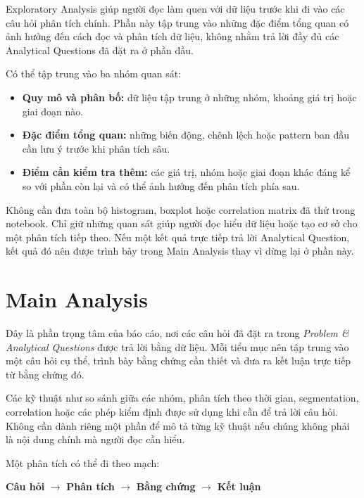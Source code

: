 \documentclass[12pt]{eDA_conquer2026}
\begin{document}
Exploratory Analysis giúp người đọc làm quen với dữ liệu trước khi đi vào các câu hỏi phân tích chính. Phần này tập trung vào những đặc điểm tổng quan có ảnh hưởng đến cách đọc và phân tích dữ liệu, không nhằm trả lời đầy đủ các Analytical Questions đã đặt ra ở phần đầu.

Có thể tập trung vào ba nhóm quan sát:
\begin{itemize}
    \item \textbf{Quy mô và phân bố:} dữ liệu tập trung ở những nhóm, khoảng giá trị hoặc giai đoạn nào.
    
    \item \textbf{Đặc điểm tổng quan:} những biến động, chênh lệch hoặc pattern ban đầu cần lưu ý trước khi phân tích sâu.
    
    \item \textbf{Điểm cần kiểm tra thêm:} các giá trị, nhóm hoặc giai đoạn khác đáng kể so với phần còn lại và có thể ảnh hưởng đến phân tích phía sau.
\end{itemize}

Không cần đưa toàn bộ histogram, boxplot hoặc correlation matrix đã thử trong notebook. Chỉ giữ những quan sát giúp người đọc hiểu dữ liệu hoặc tạo cơ sở cho một phân tích tiếp theo. Nếu một kết quả trực tiếp trả lời Analytical Question, kết quả đó nên được trình bày trong Main Analysis thay vì dừng lại ở phần này.




\newpage
\section{Main Analysis}

Đây là phần trọng tâm của báo cáo, nơi các câu hỏi đã đặt ra trong \textit{Problem \& Analytical Questions} được trả lời bằng dữ liệu. Mỗi tiểu mục nên tập trung vào một câu hỏi cụ thể, trình bày bằng chứng cần thiết và đưa ra kết luận trực tiếp từ bằng chứng đó.

Các kỹ thuật như so sánh giữa các nhóm, phân tích theo thời gian, segmentation, correlation hoặc các phép kiểm định được sử dụng khi cần để trả lời câu hỏi. Không cần dành riêng một phần để mô tả từng kỹ thuật nếu chúng không phải là nội dung chính mà người đọc cần hiểu.

Một phân tích có thể đi theo mạch:

\begin{center}
\textbf{Câu hỏi}
$\rightarrow$
\textbf{Phân tích}
$\rightarrow$
\textbf{Bằng chứng}
$\rightarrow$
\textbf{Kết luận}
\end{center}
\end{document}

